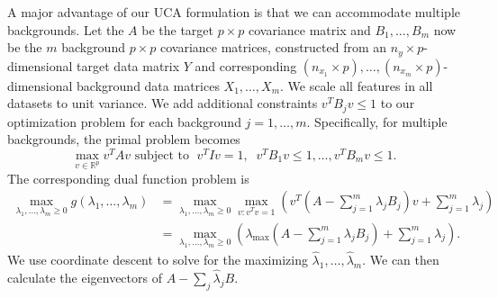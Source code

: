 \documentclass[12pt]{article}
\begin{document}
A major advantage of our UCA formulation is that we can accommodate multiple backgrounds. Let the $A$ be the target $p \times p$ covariance matrix and $ B_1, \ldots, B_m$ now be the $m$ background $p \times p$ covariance matrices, constructed from an $n_y \times p$-dimensional target data matrix $Y$ and corresponding $(n_{x_1} \times p), \ldots, (n_{x_m}\times p)$-dimensional background data matrices $X_1, \ldots, X_m$. We scale all features in all datasets to unit variance.
We add additional constraints $ v^TB_jv\leq 1$ to our optimization problem for each background $j = 1, \ldots, m$. Specifically, for multiple backgrounds, the primal problem becomes
\begin{equation}
  \label{eq:4}
  \max_{v\in \mathbb{R}^p}{v^TAv} \text{ subject to }\; v^{T} I v=1,\;\; v^TB_1 v \leq 1, \ldots, v^T B_m v\leq 1.
\end{equation}
The corresponding dual function problem is
\begin{align*}
    \max_{\lambda_1,\ldots,\lambda_m \geq 0}{g(\lambda_1, \ldots, \lambda_m)} %
                                                                                                                                &=\max_{\lambda_1,\ldots,\lambda_m \geq 0}{\max_{v : v^T v = 1}{\left(v^T\left(A - \sum^{m}_{j = 1}{\lambda_j B_j}\right)v + \sum^{m}_{j=1}{\lambda_j}\right)}}\\
                                                                                                                                &=\max_{\lambda_1,\ldots,\lambda_m \geq 0}{\left(\lambda_{\text{max}}\left(A - \sum^{m}_{j = 1}{\lambda_j B_j}\right) + \sum^{m}_{j=1}{\lambda_j}\right)}.
\end{align*}
We use coordinate descent to solve for the maximizing $\hat{\lambda}_1, \ldots, \hat{\lambda}_m$. We can then calculate the eigenvectors of $A - \sum_j \hat{\lambda}_j B$.
\end{document}
